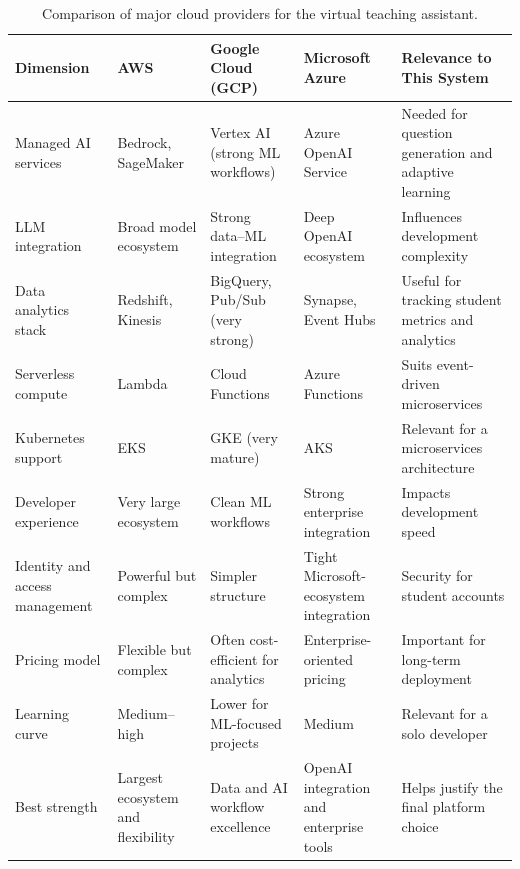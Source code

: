 \begin{table}[htb]
  \centering
  \caption{Comparison of major cloud providers for the virtual teaching
           assistant.}
  \label{impl:tab:providers}
  \footnotesize
  \renewcommand{\arraystretch}{1.3}
  \begin{tabular}{L{0.13\textwidth} L{0.18\textwidth} L{0.18\textwidth} L{0.18\textwidth} L{0.185\textwidth}}
    \hline
    \textbf{Dimension} & \textbf{AWS} & \textbf{Google Cloud (GCP)} & \textbf{Microsoft Azure} & \textbf{Relevance to This System} \\
    \hline
    Managed AI services &
      Bedrock, SageMaker &
      Vertex AI (strong ML workflows) &
      Azure OpenAI Service &
      Needed for question generation and adaptive learning \\
    LLM integration &
      Broad model ecosystem &
      Strong data--ML integration &
      Deep OpenAI ecosystem &
      Influences development complexity \\
    Data analytics stack &
      Redshift, Kinesis &
      BigQuery, Pub/Sub (very strong) &
      Synapse, Event Hubs &
      Useful for tracking student metrics and analytics \\
    Serverless compute &
      Lambda &
      Cloud Functions &
      Azure Functions &
      Suits event-driven microservices \\
    Kubernetes support &
      EKS &
      GKE (very mature) &
      AKS &
      Relevant for a microservices architecture \\
    Developer experience &
      Very large ecosystem &
      Clean ML workflows &
      Strong enterprise integration &
      Impacts development speed \\
    Identity and access management &
      Powerful but complex &
      Simpler structure &
      Tight Microsoft-ecosystem integration &
      Security for student accounts \\
    Pricing model &
      Flexible but complex &
      Often cost-efficient for analytics &
      Enterprise-oriented pricing &
      Important for long-term deployment \\
    Learning curve &
      Medium--high &
      Lower for ML-focused projects &
      Medium &
      Relevant for a solo developer \\
    Best strength &
      Largest ecosystem and flexibility &
      Data and AI workflow excellence &
      OpenAI integration and enterprise tools &
      Helps justify the final platform choice \\
    \hline
  \end{tabular}
\end{table}

